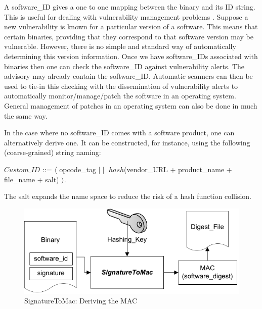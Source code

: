 
A software\_ID gives a one to one mapping between the binary and its ID string.
This is useful for dealing with vulnerability management problems \cite{sufatrio2004amo}.
Suppose a new vulnerability is known for a particular version of a software.
This means that certain binaries, providing that they correspond to that
software version may be vulnerable. However, there is no simple and standard
way of automatically determining this version information.
Once we have software\_IDs associated with binaries then one can check
the software\_ID against vulnerability alerts. The advisory may
already contain the software\_ID. 
Automatic scanners can then be used
to tie-in this checking with the dissemination of vulnerability alerts
to automatically monitor/manage/patch the software in an operating system.
General management of patches in an operating system can also be done
in much the same way.

In the case where no software\_ID comes with a software product,
one can alternatively derive one.
It can be constructed, for instance, using the following (coarse-grained) string naming:
\begin{center}
\small
$Custom\_ID$ ::= $\langle$ opcode\_tag $\mid\mid$
$hash$(vendor\_URL + product\_name + file\_name + salt) $\rangle$.
\end{center}
The salt expands the name space to reduce the risk of a hash function collision.

\begin{figure}[tb]
\begin{center}
\includegraphics[scale=0.55]{binauth/hashing}
\caption{SignatureToMac: Deriving the MAC}
\label{fig:hashing}
\end{center}
\end{figure}

